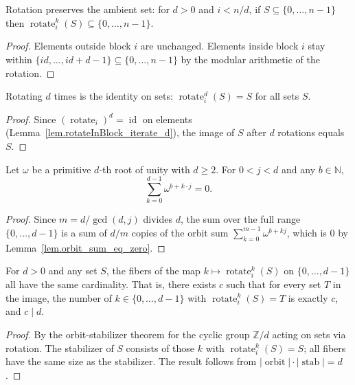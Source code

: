 \begin{lemma}
\label{lem.rotateSetInBlockK_subset}
Rotation preserves the ambient set: for $d > 0$ and $i < n/d$,
if $S \subseteq \{0, \ldots, n-1\}$ then
$\operatorname{rotate}_i^k(S) \subseteq \{0, \ldots, n-1\}$.
\end{lemma}

\begin{proof}
Elements outside block $i$ are unchanged. Elements inside block $i$
stay within $\{id, \ldots, id+d-1\} \subseteq \{0, \ldots, n-1\}$
by the modular arithmetic of the rotation.
\end{proof}

\begin{lemma}
\label{lem.rotateSetInBlockK_d}
Rotating $d$ times is the identity on sets:
$\operatorname{rotate}_i^d(S) = S$ for all sets $S$.
\end{lemma}

\begin{proof}
Since $(\operatorname{rotate}_i)^d = \operatorname{id}$ on elements
(Lemma~\ref{lem.rotateInBlock_iterate_d}), the image of $S$ after $d$
rotations equals $S$.
\end{proof}

\begin{lemma}
\label{lem.orbit_sum_full_eq_zero}
Let $\omega$ be a primitive $d$-th root of unity with $d \geq 2$.
For $0 < j < d$ and any $b \in \mathbb{N}$,
\[
\sum_{k=0}^{d-1} \omega^{b + k \cdot j} = 0.
\]
\end{lemma}

\begin{proof}
Since $m = d / \gcd(d, j)$ divides $d$, the sum over the full range
$\{0, \ldots, d-1\}$ is a sum of $d/m$ copies of the orbit sum
$\sum_{k=0}^{m-1} \omega^{b + kj}$, which is $0$ by
Lemma~\ref{lem.orbit_sum_eq_zero}.
\end{proof}

\begin{lemma}
\label{lem.rotateSetInBlockK_fiber_card_uniform}
For $d > 0$ and any set $S$, the fibers of the map
$k \mapsto \operatorname{rotate}_i^k(S)$ on $\{0, \ldots, d-1\}$ all
have the same cardinality. That is, there exists $c$ such that for
every set $T$ in the image, the number of $k \in \{0, \ldots, d-1\}$
with $\operatorname{rotate}_i^k(S) = T$ is exactly $c$, and $c \mid d$.
\end{lemma}

\begin{proof}
By the orbit-stabilizer theorem for the cyclic group $\mathbb{Z}/d$
acting on sets via rotation. The stabilizer of $S$ consists of those
$k$ with $\operatorname{rotate}_i^k(S) = S$; all fibers have the same
size as the stabilizer. The result follows from
$|\operatorname{orbit}| \cdot |\operatorname{stab}| = d$.
\end{proof}

